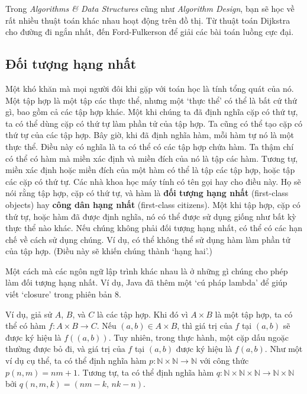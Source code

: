\begin{infobox}
Trong \emph{Algorithms \& Data Structures} cũng như \emph{Algorithm Design}, bạn sẽ học về rất nhiều thuật toán khác nhau hoạt động trên đồ thị. Từ thuật toán Dijkstra cho đường đi ngắn nhất, đến Ford-Fulkerson để giải các bài toán luồng cực đại.
\end{infobox}

\subsection{Đối tượng hạng nhất}

Một khó khăn mà mọi người đôi khi gặp với toán học là tính tổng quát của nó. Một tập hợp là một tập các thực thể, nhưng một `thực thể' có thể là bất cứ thứ gì, bao gồm cả các tập hợp khác. Một khi chúng ta đã định nghĩa cặp có thứ tự, ta có thể dùng cặp có thứ tự làm phần tử của tập hợp. Ta cũng có thể tạo cặp có thứ tự của các tập hợp. Bây giờ, khi đã định nghĩa hàm, mỗi hàm tự nó là một thực thể. Điều này có nghĩa là ta có thể có các tập hợp chứa hàm. Ta thậm chí có thể có hàm mà miền xác định và miền đích của nó là tập các hàm. Tương tự, miền xác định hoặc miền đích của một hàm có thể là tập các tập hợp, hoặc tập các cặp có thứ tự. Các nhà khoa học máy tính có tên gọi hay cho điều này. Họ sẽ nói rằng tập hợp, cặp có thứ tự, và hàm là \textbf{đối tượng hạng nhất} (first-class objects) hay \textbf{công dân hạng nhất} (first-class citizens). Một khi tập hợp, cặp có thứ tự, hoặc hàm đã được định nghĩa, nó có thể được sử dụng giống như bất kỳ thực thể nào khác. Nếu chúng không phải đối tượng hạng nhất, có thể có các hạn chế về cách sử dụng chúng. Ví dụ, có thể không thể sử dụng hàm làm phần tử của tập hợp. (Điều này sẽ khiến chúng thành `hạng hai'.)

\begin{notebox}
Một cách mà các ngôn ngữ lập trình khác nhau là ở những gì chúng cho phép làm đối tượng hạng nhất. Ví dụ, Java đã thêm một `cú pháp lambda' để giúp viết `closure' trong phiên bản 8.
\end{notebox}

Ví dụ, giả sử $A$, $B$, và $C$ là các tập hợp. Khi đó vì $A \times B$ là một tập hợp, ta có thể có hàm $f\colon A \times B \to C$. Nếu $(a,b) \in A \times B$, thì giá trị của $f$ tại $(a,b)$ sẽ được ký hiệu là $f((a,b))$. Tuy nhiên, trong thực hành, một cặp dấu ngoặc thường được bỏ đi, và giá trị của $f$ tại $(a,b)$ được ký hiệu là $f(a,b)$. Như một ví dụ cụ thể, ta có thể định nghĩa hàm $p\colon \mathbb{N} \times \mathbb{N} \to \mathbb{N}$ với công thức $p(n,m) = nm + 1$. Tương tự, ta có thể định nghĩa hàm $q\colon \mathbb{N} \times \mathbb{N} \times \mathbb{N} \to \mathbb{N} \times \mathbb{N}$ bởi $q(n,m,k) = (nm - k,\, nk - n)$.

